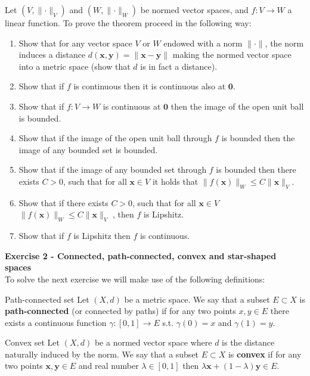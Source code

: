 \documentclass[12pt,a4paper]{article}
\begin{document}
\noindent Let $(V,\lVert\cdot\rVert_V)$ and $(W,\lVert\cdot\rVert_W)$ be normed vector spaces, and $f:V\to W$ a linear function. To prove the theorem proceed in the following way:
\begin{enumerate}
	\item Show that for any vector space $V$ or $W$ endowed with a norm $\lVert\cdot\rVert$, the norm induces a distance $d(\textbf{x},\textbf{y})=\|\textbf{x}-\textbf{y} \|$ making the normed vector space into a metric space (show that $d$ is in fact a distance).
	\item Show that if $f$ is continuous then it is continuous also at $\textbf{0}$.
	\item Show that if $f:V\to W$ is continuous at $\textbf{0}$ then the image of the open unit ball is bounded.
	\item Show that if the image of the open unit ball through $f$ is bounded then the image of any bounded set is bounded.
	\item Show that if the image of any bounded set through $f$ is bounded then there exists $C>0$, such that for all $\textbf{x}\in V$ it holds that 
	$
	\| f(\textbf{x}) \|_W\leq C  \| \textbf{x} \|_V.
	$
	\item Show that if there exists $C>0$, such that for all $\textbf{x}\in V$  
	$
	\| f(\textbf{x}) \|_W\leq C  \| \textbf{x} \|_V
	$
	, then $f$ is Lipshitz.
	\item Show that if $f$ is Lipshitz then $f$ is continuous.
\end{enumerate}
\bigskip

\newpage
\noindent\textbf{Exercise 2 - Connected, path-connected, convex and star-shaped spaces}\\

To solve the next exercise we will make use of the following definitions:

\begin{Definition}{Path-connected set}{}
	Let $(X,d)$ be a metric space. We say that a subset $E\subset X$ is \textbf{path-connected} (or connected by paths) if for any two points $x,y\in E$ there exists a continuous function $\gamma:[0,1]\to E$ s.t. $\gamma(0)=x$ and $\gamma(1)=y$.
\end{Definition}

\begin{Definition}{Convex set}{}
	Let $(X,d)$ be a normed vector space where $d$ is the distance naturally induced by the norm. We say that a subset $E\subset X$ is \textbf{convex} if for any two points $\textbf{x},\textbf{y}\in E$ and real number $\lambda\in[0,1]$ then $\lambda\textbf{x}+ (1-\lambda)\textbf{y}\in E$.
\end{Definition}
\end{document}
